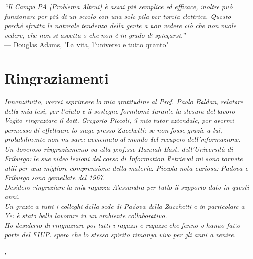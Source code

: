 
\cleardoublepage
{}
{}

\begin{flushright}{
	\slshape    
	``Il Campo PA (Problema Altrui) è assai più semplice ed efficace, inoltre può funzionare per più di un secolo con una sola pila per torcia elettrica. Questo perché sfrutta la naturale tendenza della gente a non vedere ciò che non vuole vedere, che non si aspetta o che non è in grado di spiegarsi.''} \\ 
	\medskip
    --- Douglas Adams, "La vita, l'universo e tutto quanto"
\end{flushright}


\bigskip

\begingroup
\let\clearpage\relax
\let\cleardoublepage\relax
\let\cleardoublepage\relax

\chapter*{Ringraziamenti}

\noindent \textit{Innanzitutto, vorrei esprimere la mia gratitudine al Prof. Paolo Baldan, relatore della mia tesi, per l'aiuto e il sostegno fornitomi durante la stesura del lavoro.}\\

\noindent \textit{Voglio ringraziare il dott. Gregorio Piccoli, il mio tutor aziendale, per avermi permesso di effettuare lo stage presso Zucchetti: se non fosse grazie a lui, probabilmente non mi sarei avvicinato al mondo del recupero dell'informazione.} \\

\noindent \textit{Un doveroso ringraziamento va alla prof.ssa Hannah Bast, dell'Università di Friburgo: le sue video lezioni del corso di Information Retrieval mi sono tornate utili per una migliore comprensione della materia. Piccola nota curiosa: Padova e Friburgo sono gemellate dal 1967.}\\

\noindent \textit{Desidero ringraziare la mia ragazza Alessandra per tutto il supporto dato in questi anni.}\\

\noindent \textit{Un grazie a tutti i colleghi della sede di Padova della Zucchetti e in particolare a Ye: è stato bello lavorare in un ambiente collaborativo.}\\

\noindent \textit{Ho desiderio di ringraziare poi tutti i ragazzi e ragazze che fanno o hanno fatto parte del FIUP: spero che lo stesso spirito rimanga vivo per gli anni a venire.}\\
\bigskip

\noindent\textit{\myLocation, \myTime}
\hfill \myName

\endgroup

